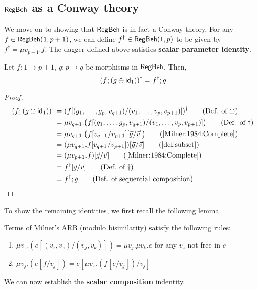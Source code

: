 \subsection{$\mathsf{RegBeh}$ as a Conway theory}
We move on to showing that $\mathsf{RegBeh}$ is in fact a Conway theory. For any $f \in \mathsf{RegBeh}(1, p + 1)$, we can define $f^\dagger \in \mathsf{RegBeh}(1,p)$ to be given by $f^\dagger = \mu v_{p+1}.f$.
The dagger defined above satisfies \textbf{scalar parameter identity}.
\begin{lemma}\label{conway1}
	Let $f \colon 1 \to p + 1$, $g \colon p \to q$ be morphisms in $\mathsf{RegBeh}$. Then,
	$$
	(f ; (g\oplus \mathsf{id}_1))^\dagger = f^\dagger ; g
	$$
\end{lemma}
\begin{proof}
\begin{align*}
(f ; (g \oplus \id_1))^\dagger & = (f[(g_1, \dots, g_p, v_{q+1})/(v_1, \dots, v_{p}, v_{p+1})])^\dagger \tag{Def. of $\oplus$}\\
& = \mu v_{q+1}.\big(f[(g_1, \dots, g_p, v_{q+1})/(v_1, \dots, v_{p}, v_{p+1})]\big) \tag{Def. of $\dagger$}\\
& = \mu v_{q+1}.\big(f[v_{q+1}/v_{p+1}][\vec{g}/\vec{v}]\big) \tag{\cite[Lemma~5.6 2.]{Milner:1984:Complete}}\\
& = (\mu v_{q+1}.f[v_{q+1}/v_{p+1}])[\vec{g}/\vec{v}] \tag{\Cref{def:subset}}\\
& = (\mu v_{p+1}.f)[\vec{g}/\vec{v}] \tag{\cite[Proposition~4.6 5.]{Milner:1984:Complete}}\\
& = f^\dagger[\vec{g}/\vec{v}] \tag{Def. of $\dagger$}\\
& = f^\dagger ; g \tag{Def. of sequential composition\hfill\qedhere}
\end{align*}
\end{proof}
To show the remaining identities, we first recall the following lemma.
 \begin{lemma}
\label{lem:recursion-substitution}
Terms of Milner's ARB (modulo bisimilarity) satisfy the following rules:
	\begin{enumerate}
		\item $\mu v_z. \left(e [(v_z, v_z) / (v_j, v_k)]\right) = \mu v_j. \mu v_k. e$ for any $v_z$ not free in $e$
		\item $ \mu v_j.\left(e[f/v_j]\right) = e[\mu v_x. \left(f[e/v_j]\right)/v_j]$
	\end{enumerate}
\end{lemma}
We can now establish the \textbf{scalar composition} indentity.
